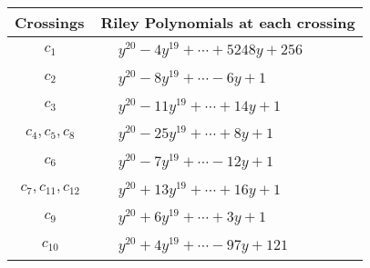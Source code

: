 \documentclass[1p]{elsarticle_modified}
\theoremstyle{definition}
\begin{document}
\begin{tabular}{m{50pt}|m{274pt}}
Crossings & \hspace{64pt}Riley Polynomials at each crossing \\
\hline $$\begin{aligned}c_{1}\end{aligned}$$&$\begin{aligned}
&y^{20}-4 y^{19}+\cdots+5248 y+256
\end{aligned}$\\
\hline $$\begin{aligned}c_{2}\end{aligned}$$&$\begin{aligned}
&y^{20}-8 y^{19}+\cdots-6 y+1
\end{aligned}$\\
\hline $$\begin{aligned}c_{3}\end{aligned}$$&$\begin{aligned}
&y^{20}-11 y^{19}+\cdots+14 y+1
\end{aligned}$\\
\hline $$\begin{aligned}c_{4},c_{5},c_{8}\end{aligned}$$&$\begin{aligned}
&y^{20}-25 y^{19}+\cdots+8 y+1
\end{aligned}$\\
\hline $$\begin{aligned}c_{6}\end{aligned}$$&$\begin{aligned}
&y^{20}-7 y^{19}+\cdots-12 y+1
\end{aligned}$\\
\hline $$\begin{aligned}c_{7},c_{11},c_{12}\end{aligned}$$&$\begin{aligned}
&y^{20}+13 y^{19}+\cdots+16 y+1
\end{aligned}$\\
\hline $$\begin{aligned}c_{9}\end{aligned}$$&$\begin{aligned}
&y^{20}+6 y^{19}+\cdots+3 y+1
\end{aligned}$\\
\hline $$\begin{aligned}c_{10}\end{aligned}$$&$\begin{aligned}
&y^{20}+4 y^{19}+\cdots-97 y+121
\end{aligned}$\\
\hline
\end{tabular}\\~\\
\end{document}
